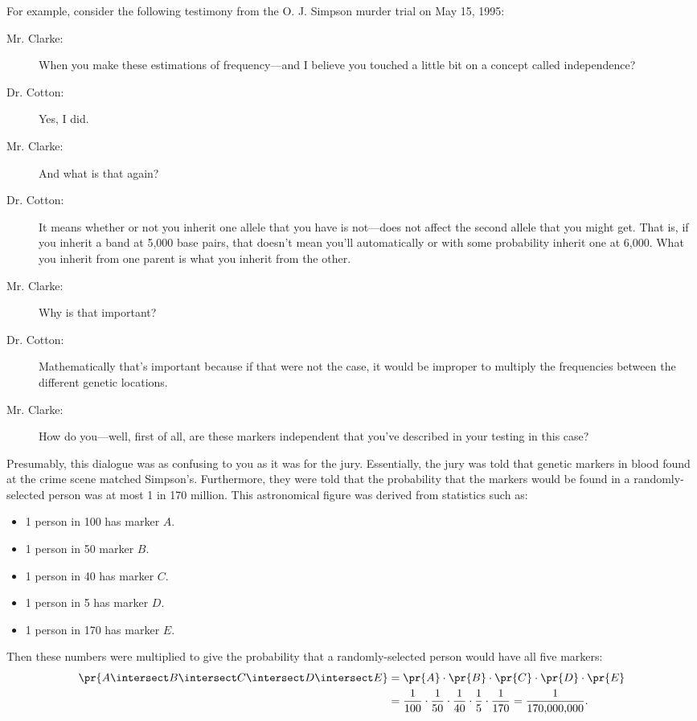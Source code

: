 For example, consider the following testimony from the O. J. Simpson
murder trial on May 15, 1995:
\begin{description}

\item[Mr. Clarke:] When you make these estimations of frequency---and
I believe you touched a little bit on a concept called independence?

\item[Dr. Cotton:] Yes, I did.

\item[Mr. Clarke:] And what is that again?

\item[Dr. Cotton:] It means whether or not you inherit one allele that
you have is not---does not affect the second allele that you might
get.  That is, if you inherit a band at 5,000 base pairs, that doesn't
mean you'll automatically or with some probability inherit one at
6,000.  What you inherit from one parent is what you inherit from the
other.

\item[Mr. Clarke:] Why is that important?

\item[Dr. Cotton:] Mathematically that's important because if that
were not the case, it would be improper to multiply the frequencies
between the different genetic locations.

\item[Mr. Clarke:] How do you---well, first of all, are these markers
independent that you've described in your testing in this case?

\end{description}

Presumably, this dialogue was as confusing to you as it was for the
jury.  Essentially, the jury was told that genetic markers in blood
found at the crime scene matched Simpson's.  Furthermore, they were
told that the probability that the markers would be found in a
randomly-selected person was at most 1 in 170 million.  This
astronomical figure was derived from statistics such as:
%
\begin{itemize}
\item 1 person in 100 has marker $A$.
\item 1 person in 50 marker $B$.
\item 1 person in 40 has marker $C$.
\item 1 person in 5 has marker $D$.
\item 1 person in 170 has marker $E$.
\end{itemize}
%
Then these numbers were multiplied to give the probability that a
randomly-selected person would have all five markers:
\begin{align*}
\pr{A \intersect B \intersect C \intersect D \intersect E}
    & = \pr{A} \cdot \pr{B} \cdot \pr{C} \cdot \pr{D} \cdot \pr{E}\\
    & = \frac{1}{100} \cdot \frac{1}{50} \cdot \frac{1}{40}
                     \cdot \frac{1}{5} \cdot \frac{1}{170}
     = \frac{1}{170{,}000{,}000}.
\end{align*}

